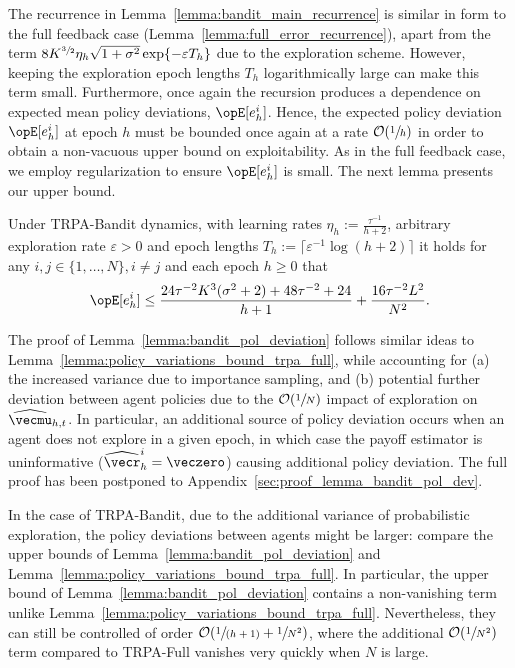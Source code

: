 The recurrence in Lemma~\ref{lemma:bandit_main_recurrence} is similar in form to the full feedback case (Lemma~\ref{lemma:full_error_recurrence}), apart from the term $8 K^{\sfrac{3}{2}}\eta_h \sqrt{1+\sigma^2}  \exp\{-\varepsilon T_h\}$ due to the exploration scheme.
However, keeping the exploration epoch lengths $T_h$ logarithmically large can make this term small.
Furthermore, once again the recursion produces a dependence on expected mean policy deviations, $\Exop[e_h^i]$.
Hence, the expected policy deviation $\Exop[e_h^i]$ at epoch $h$ must be bounded once again at a rate $\mathcal{O}(\sfrac{1}{h})$ in order to obtain a non-vacuous upper bound on exploitability.
As in the full feedback case, we employ regularization to ensure $\Exop[e_h^i]$ is small.
The next lemma presents our upper bound.

\begin{lemma}\label{lemma:bandit_pol_deviation}
Under TRPA-Bandit dynamics, with learning rates $\eta_h:=\frac{\tau^{-1}}{h+2}$, arbitrary exploration rate $\varepsilon > 0$ and epoch lengths $T_h := \lceil \varepsilon^{-1} \log(h+2) \rceil$
it holds for any $i,j \in \{1, \ldots, N \}, i\neq j$ and each epoch $h\geq 0$ that
\begin{align*}
    \Exop[e_h^i] \leq \frac{24\tau^{-2} K^3 (\sigma^2 + 2) + 48\tau^{-2} + 24}{h+1} + \frac{16\tau^{-2} L ^ 2}{N^2}.
\end{align*}
\end{lemma}
The proof of Lemma~\ref{lemma:bandit_pol_deviation} follows similar ideas to Lemma~\ref{lemma:policy_variations_bound_trpa_full}, while accounting for (a) the increased variance due to importance sampling, and (b) potential further deviation between agent policies due to the $\mathcal{O}(\sfrac{1}{N})$ impact of exploration on $\widehat{\vecmu}_{h,t}$.
In particular, an additional source of policy deviation occurs when an agent does not explore in a given epoch, in which case the payoff estimator is uninformative ($\widehat{\vecr}_h^i = \veczero$) causing additional policy deviation.
The full proof has been postponed to Appendix~\ref{sec:proof_lemma_bandit_pol_dev}.

In the case of TRPA-Bandit, due to the additional variance of probabilistic exploration, the policy deviations between agents might be larger: compare the upper bounds of Lemma~\ref{lemma:bandit_pol_deviation} and Lemma~\ref{lemma:policy_variations_bound_trpa_full}.
In particular, the upper bound of Lemma~\ref{lemma:bandit_pol_deviation} contains a non-vanishing term unlike Lemma~\ref{lemma:policy_variations_bound_trpa_full}.
Nevertheless, they can still be controlled of order $\mathcal{O}(\sfrac{1}{(h+1)} + \sfrac{1}{N^2})$, where the additional $\mathcal{O}(\sfrac{1}{N^2})$ term compared to TRPA-Full vanishes very quickly when $N$ is large.

